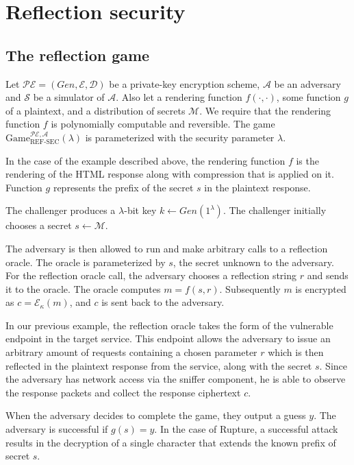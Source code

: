 \section{Reflection security}\label{sec:refsec}

\subsection{The reflection game}\label{subsec:refsecgame}

Let $\mathcal{PE} = (Gen, \mathcal{E}, \mathcal{D})$ be a private-key encryption
scheme, $\mathcal{A}$ be an adversary and $\mathcal{S}$ be a simulator of
$\mathcal{A}$. Also let a rendering function $f(\cdot, \cdot)$, some function
$g$ of a plaintext, and a distribution of secrets $\mathcal{M}$. We require that
the rendering function $f$ is polynomially computable and reversible. The game
$\text{Game}_{\text{REF-SEC}}^{\mathcal{PE},\mathcal{A}}(\lambda)$ is
parameterized with the security parameter $\lambda$.

In the case of the example described above, the rendering function $f$ is the
rendering of the HTML response along with compression that is applied on it.
Function $g$ represents the prefix of the secret $s$ in the plaintext response.

The challenger produces a $\lambda$-bit key $k \leftarrow Gen(1^\lambda)$. The
challenger initially chooses a secret $s \leftarrow \mathcal{M}$.

The adversary is then allowed to run and make arbitrary calls to a reflection
oracle. The oracle is parameterized by $s$, the secret unknown to the adversary.
For the reflection oracle call, the adversary chooses a reflection string $r$
and sends it to the oracle. The oracle computes $m = f(s, r)$. Subsequently $m$
is encrypted as $c = \mathcal{E}_\kappa(m)$, and $c$ is sent back to the
adversary.

In our previous example, the reflection oracle takes the form of the vulnerable
endpoint in the target service. This endpoint allows the adversary to issue an
arbitrary amount of requests containing a chosen parameter $r$ which is then
reflected in the plaintext response from the service, along with the secret $s$.
Since the adversary has network access via the sniffer component, he is able to
observe the response packets and collect the response ciphertext $c$.

When the adversary decides to complete the game, they output a guess $y$. The
adversary is successful if $g(s) = y$. In the case of Rupture, a successful
attack results in the decryption of a single character that extends the known
prefix of secret $s$.

